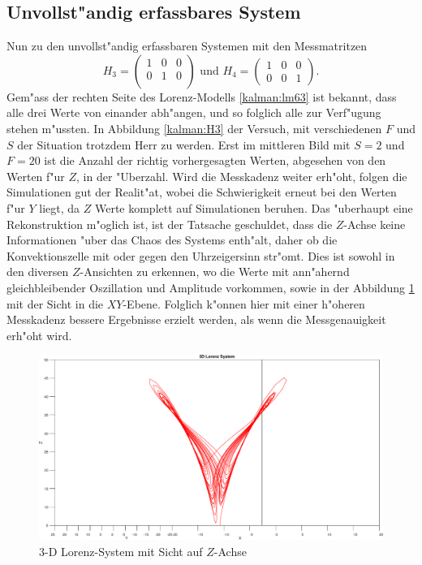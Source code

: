 \begin{refsection}
\subsection{Unvollst"andig erfassbares System}
Nun zu den unvollst"andig erfassbaren Systemen mit den Messmatritzen 
\[H_{3}=\begin{pmatrix}
1 & 0 & 0 \\ 
0 & 1 & 0 \\ 
\end{pmatrix} 
\text{ und }
H_{4}=\begin{pmatrix}
1 & 0 & 0 \\ 
0 & 0 & 1
\end{pmatrix}
\text{.}
\]
Gem"ass der rechten Seite des Lorenz-Modells \eqref{kalman:lm63} ist bekannt, dass alle drei Werte von einander abh"angen, und so folglich alle zur Verf"ugung stehen m"ussten. In Abbildung \ref{kalman:H3} der Versuch, mit verschiedenen $F$ und $S$ der Situation trotzdem Herr zu werden. Erst im mittleren Bild mit $S=2$ und $F=20$ ist die Anzahl der richtig vorhergesagten Werten, abgesehen von den Werten f"ur $Z$, in der "Uberzahl. Wird die Messkadenz weiter erh"oht, folgen die Simulationen gut der Realit"at, wobei die Schwierigkeit erneut bei den Werten f"ur $Y$ liegt, da $Z$ Werte komplett auf Simulationen beruhen. Das "uberhaupt eine Rekonstruktion m"oglich ist, ist der Tatsache geschuldet, dass die $Z$-Achse keine Informationen "uber das Chaos des Systems enth"alt, daher ob die Konvektionszelle mit oder gegen den Uhrzeigersinn str"omt. Dies ist sowohl in den diversen $Z$-Ansichten zu erkennen, wo die Werte mit ann"ahernd gleichbleibender Oszillation und Amplitude vorkommen, sowie in der Abbildung \ref{kalman:zview} mit der Sicht in die $XY$-Ebene.
Folglich k"onnen hier mit einer h"oheren Messkadenz bessere Ergebnisse erzielt werden, als wenn die Messgenauigkeit erh"oht wird.

\begin{figure}
\centering
\includegraphics[width=\hsize]{kalman/figures/zview.pdf}
\caption{3-D Lorenz-System mit Sicht auf $Z$-Achse}
\label{kalman:zview}
\end{figure}


\end{refsection}
